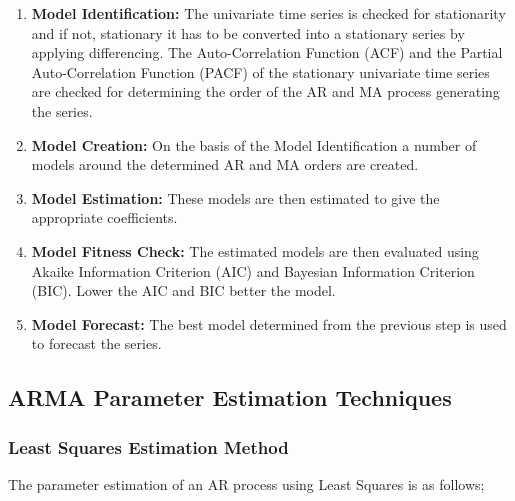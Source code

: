 \documentclass[journal]{IEEEtran}
\begin{document}
\begin{enumerate}

  \item \textbf{Model Identification:} The univariate time series is checked for stationarity and if not, stationary it has to be converted into a stationary series by applying differencing. The Auto-Correlation Function (ACF) and the Partial Auto-Correlation Function (PACF) of the stationary univariate time series are checked for determining the order of the AR and MA process generating the series.
  \item \textbf{Model Creation:} On the basis of the Model Identification a number of models around the determined AR and MA orders are created.
  \item \textbf{Model Estimation:} These models are then estimated to give the appropriate coefficients.
  \item \textbf{Model Fitness Check:} The estimated models are then evaluated using Akaike Information Criterion (AIC) and Bayesian Information Criterion (BIC). Lower the AIC and BIC better the model.
  \item \textbf{Model Forecast:} The best model determined from the previous step is used to forecast the series.


\end{enumerate}

\newpage

\subsection{ARMA Parameter Estimation Techniques}



\subsubsection{Least Squares Estimation Method}

The parameter estimation of an AR process using Least Squares is as follows;
\end{document}
